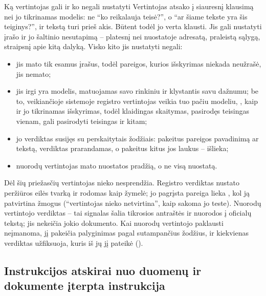 \begin{aibox}{Ką vertintojas gali ir ko negali nustatyti}
Vertintojas atsako į siauresnį klausimą nei jo tikrinamas modelis: ne \enquote{ko reikalauja
teisė?}, o \enquote{ar šiame tekste yra šis teiginys?}, ir tekstą turi prieš akis. Būtent
todėl jo verta klausti. Jis gali nustatyti įrašo ir jo šaltinio nesutapimą -- platesnį nei
nuostatoje adresatą, praleistą sąlygą, straipsnį apie kitą dalyką. Visko kito jis nustatyti
negali:
\begin{itemize}
  \item jis mato tik esamus įrašus, todėl pareigos, kurios išskyrimas niekada neužrašė, jis
    nemato;
  \item jis irgi yra modelis, matuojamas savo rinkiniu ir klystantis savu dažnumu; be to,
    veikiančioje sistemoje registro vertintojas veikia tuo pačiu modeliu,
    , kaip ir jo tikrinamas išskyrimas, todėl klaidingas skaitymas,
    pasirodęs teisingas vienam, gali pasirodyti teisingas ir kitam;
  \item jo verdiktas susijęs su perskaitytais žodžiais: pakeitus pareigos pavadinimą ar
    tekstą, verdiktas prarandamas, o pakeitus kitus jos laukus -- išlieka;
  \item nuorodų vertintojas mato nuostatos pradžią, o ne visą nuostatą.
\end{itemize}
Dėl šių priežasčių vertintojas nieko nesprendžia. Registro verdiktas nustato peržiūros eilės
tvarką ir rodomas kaip žymelė; jo pagrįsta pareiga lieka , kol ją patvirtina
žmogus (\enquote{vertintojas nieko netvirtina}, kaip sakoma jo teste). Nuorodų vertintojo
verdiktas -- tai signalas šalia tikrosios antraštės ir nuorodos į oficialų tekstą; jis
nekeičia jokio dokumento. Kai nuorodų vertintojo paklausti neįmanoma, jį pakeičia palyginimas
pagal sutampančius žodžius, ir kiekvienas verdiktas užfiksuoja, kuris iš jų jį pateikė
().
\end{aibox}

\subsection{Instrukcijos atskirai nuo duomenų ir dokumente įterpta instrukcija}\label{sec:control:injection}

